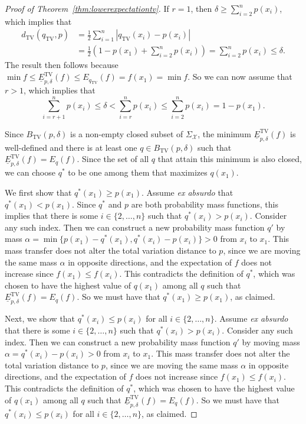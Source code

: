 \documentclass[10pt,a4paper]{amsart}
\begin{document}
\begin{proof}[Proof of Theorem~\ref{thm:lowerexpectationtv}]
If $r=1$, then $\delta\geq\sum_{i=2}^n p(x_i)$, which implies that
\begin{align*}
d_{\mathrm{TV}}(q_\mathrm{TV},p)
&=\frac{1}{2}\sum_{i=1}^n|q_\mathrm{TV}(x_i)-p(x_i)|\\
&=\frac{1}{2}\left(1-p(x_1)+\sum_{i=2}^n p(x_i)\right)
=\sum_{i=2}^n p(x_i)\leq\delta.
\end{align*}
The result then follows because $\min f\leq\underline{E}^\mathrm{TV}_{p,\delta}(f)\leq E_{q_\mathrm{TV}}(f)=f(x_1)=\min f$. So we can now assume that $r>1$, which implies that 
\begin{equation*}
\sum_{i=r+1}^n p(x_i)\leq\delta<\sum_{i=r}^{n} p(x_i)\leq\sum_{i=2}^n p(x_i)=1-p(x_1).
\end{equation*}

Since $B_\mathrm{TV}(p,\delta)$ is a non-empty closed subset of $\Sigma_\mathcal{X}$, the minimum $\underline{E}^\mathrm{TV}_{p,\delta}(f)$ is well-defined and there is at least one $q\in B_\mathrm{TV}(p,\delta)$ such that $\underline{E}^\mathrm{TV}_{p,\delta}(f)=E_q(f)$. Since the set of all $q$ that attain this minimum is also closed, we can choose $q^*$ to be one among them that maximizes $q(x_1)$.


We first show that $q^*(x_1)\geq p(x_1)$. Assume \emph{ex absurdo} that $q^*(x_1)<p(x_1)$. Since $q^*$ and $p$ are both probability mass functions, this implies that there is some $i\in\{2,\ldots,n\}$ such that $q^*(x_i)>p(x_i)$. Consider any such index. Then we can construct a new probability mass function $q'$ by mass $\alpha=\min\{p(x_1)-q^*(x_1),q^*(x_{i})-p(x_{i})\}>0$ from $x_{i}$ to $x_1$. This mass transfer does not alter the total variation distance to $p$, since we are moving the same mass $\alpha$ in opposite directions, and the expectation of $f$ does not increase since $f(x_1)\leq f(x_i)$. This contradicts the definition of $q^*$, which was chosen to have the highest value of $q(x_1)$ among all $q$ such that $\underline{E}^\mathrm{TV}_{p,\delta}(f)=E_q(f)$. So we must have that $q^*(x_1)\geq p(x_1)$, as claimed.

Next, we show that $q^*(x_i)\leq p(x_i)$ for all $i\in\{2,\ldots,n\}$. Assume \emph{ex absurdo} that there is some $i\in\{2,\ldots,n\}$ such that $q^*(x_i)>p(x_i)$. Consider any such index. Then we can construct a new probability mass function $q'$ by moving mass $\alpha=q^*(x_i)-p(x_i)>0$ from $x_i$ to $x_1$. This mass transfer does not alter the total variation distance to $p$, since we are moving the same mass $\alpha$ in opposite directions, and the expectation of $f$ does not increase since $f(x_1)\leq f(x_i)$. This contradicts the definition of $q^*$, which was chosen to have the highest value of $q(x_1)$ among all $q$ such that $\underline{E}^\mathrm{TV}_{p,\delta}(f)=E_q(f)$. So we must have that $q^*(x_i)\leq p(x_i)$ for all $i\in\{2,\ldots,n\}$, as claimed.


\end{proof}
\end{document}

